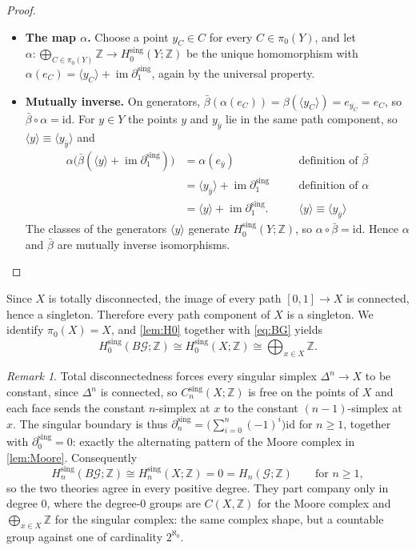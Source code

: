 \documentclass{extracta-temp-26}
\numberwithin{equation}{section}
\theoremstyle{definition}
\theoremstyle{remark}
\newtheorem{rem}[teo]{Remark}
\newcommand{\G}{\mathcal{G}}
\newcommand{\Z}{\mathbb{Z}}
\newcommand{\id}{\mathrm{id}}
\newcommand{\Hsing}{H^{\mathrm{sing}}}
\newcommand{\Csing}{C^{\mathrm{sing}}}
\newcommand{\dsing}{\partial^{\mathrm{sing}}}
\newcommand{\gen}[1]{\langle #1\rangle}
\DeclareMathOperator{\im}{im}
\newcommand{\step}[1]{\textbf{#1}}
\begin{document}
\begin{proof}
\begin{itemize}
because the two endpoints lie in the same path component.
Hence \(\beta\) vanishes on \(\im\dsing_1\) and induces a homomorphism \(\bar\beta\colon\Hsing_0(Y;\Z)\to\bigoplus_{C\in\pi_0(Y)}\Z\).
\item \step{The map \(\alpha\).}
Choose a point \(y_C\in C\) for every \(C\in\pi_0(Y)\), and let \(\alpha\colon\bigoplus_{C\in\pi_0(Y)}\Z\to\Hsing_0(Y;\Z)\) be the unique homomorphism with \(\alpha(e_C)=\gen{y_C}+\im\dsing_1\), again by the universal property.
\item \step{Mutually inverse.}
On generators, \(\bar\beta(\alpha(e_C))=\beta(\gen{y_C})=e_{\overline{y_C}}=e_C\), so \(\bar\beta\circ\alpha=\id\).
For \(y\in Y\) the points \(y\) and \(y_{\bar y}\) lie in the same path component, so \(\gen{y}\equiv\gen{y_{\bar y}}\) and
\begin{equation}\label{eq:alpha-beta}
\begin{aligned}
\alpha\bigl(\bar\beta(\gen{y}+\im\dsing_1)\bigr)
&=\alpha(e_{\bar y})&&\quad\text{definition of \(\bar\beta\)}\\
&=\gen{y_{\bar y}}+\im\dsing_1&&\quad\text{definition of \(\alpha\)}\\
&=\gen{y}+\im\dsing_1.&&\quad\text{\(\gen{y}\equiv\gen{y_{\bar y}}\)}
\end{aligned}
\end{equation}
The classes of the generators \(\gen{y}\) generate \(\Hsing_0(Y;\Z)\), so \(\alpha\circ\bar\beta=\id\).
Hence \(\alpha\) and \(\bar\beta\) are mutually inverse isomorphisms.\qedhere
\end{itemize}
\end{proof}

Since \(X\) is totally disconnected, the image of every path \([0,1]\to X\) is connected, hence a singleton.
Therefore every path component of \(X\) is a singleton.
We identify \(\pi_0(X)=X\), and \cref{lem:H0} together with \eqref{eq:BG} yields
\begin{equation}\label{eq:H0-cantor}
\Hsing_0(B\G;\Z)\cong\Hsing_0(X;\Z)\cong\bigoplus_{x\in X}\Z.
\end{equation}

\begin{rem}\label{rem:onlydeg0}
Total disconnectedness forces every singular simplex \(\Delta^n\to X\) to be constant, since \(\Delta^n\) is connected, so \(\Csing_n(X;\Z)\) is free on the points of \(X\) and each face sends the constant \(n\)-simplex at \(x\) to the constant \((n-1)\)-simplex at \(x\).
The singular boundary is thus \(\dsing_n=\bigl(\sum_{i=0}^n(-1)^i\bigr)\id\) for \(n\ge 1\), together with \(\dsing_0=0\): exactly the alternating pattern of the Moore complex in \cref{lem:Moore}.
Consequently
\begin{equation}\label{eq:sing-vanish}
\Hsing_n(B\G;\Z)\cong\Hsing_n(X;\Z)=0=H_n(\G;\Z)\qquad\text{for } n\ge 1,
\end{equation}
so the two theories agree in every positive degree.
They part company only in degree \(0\), where the degree-\(0\) groups are \(C(X,\Z)\) for the Moore complex and \(\bigoplus_{x\in X}\Z\) for the singular complex: the same complex shape, but a countable group against one of cardinality \(2^{\aleph_0}\).
\end{rem}
\end{document}
